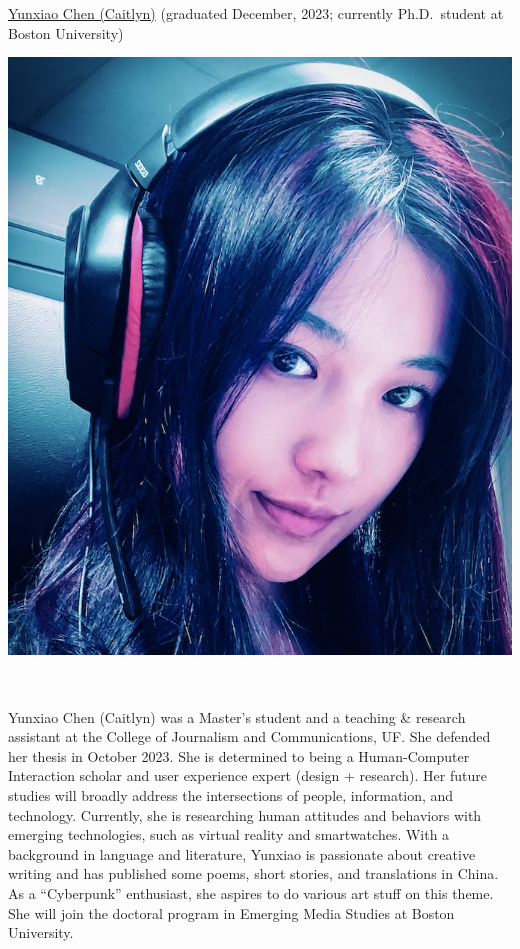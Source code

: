 \documentclass[]{article}
\begin{document}
\href{https://www.linkedin.com/in/yunxiao-caitlyn-chen-133413178/}{Yunxiao
Chen (Caitlyn)} (graduated December, 2023; currently Ph.D.~student at
Boston University)

\includegraphics{images/yunxiao.jpg}

~

Yunxiao Chen (Caitlyn) was a Master's student and a teaching \& research
assistant at the College of Journalism and Communications, UF. She
defended her thesis in October 2023. She is determined to being a
Human-Computer Interaction scholar and user experience expert (design +
research). Her future studies will broadly address the intersections of
people, information, and technology. Currently, she is researching human
attitudes and behaviors with emerging technologies, such as virtual
reality and smartwatches. With a background in language and literature,
Yunxiao is passionate about creative writing and has published some
poems, short stories, and translations in China. As a ``Cyberpunk''
enthusiast, she aspires to do various art stuff on this theme. She will
join the doctoral program in Emerging Media Studies at Boston
University.\\
\end{document}
